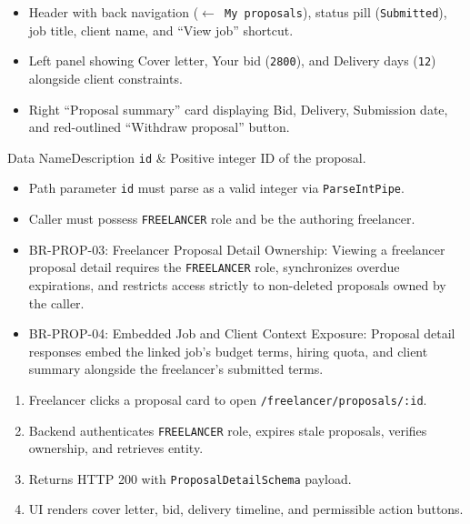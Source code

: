 \begin{itemize}[leftmargin=1.6em,topsep=3pt,itemsep=2pt,parsep=0pt,label=$\bullet$]
    \item Header with back navigation (\texttt{$\leftarrow$ My proposals}), status pill (\texttt{Submitted}), job title, client name, and ``View job'' shortcut.
    \item Left panel showing Cover letter, Your bid (\texttt{2800}), and Delivery days (\texttt{12}) alongside client constraints.
    \item Right ``Proposal summary'' card displaying Bid, Delivery, Submission date, and red-outlined ``Withdraw proposal'' button.
\end{itemize}


\begin{specdatatable}{Data Name}{Description}
\texttt{id} & Positive integer ID of the proposal.\\ \hline
\end{specdatatable}

\begin{itemize}[leftmargin=1.6em,topsep=3pt,itemsep=2pt,parsep=0pt,label=$\bullet$]
    \item Path parameter \texttt{id} must parse as a valid integer via \texttt{ParseIntPipe}.
    \item Caller must possess \texttt{FREELANCER} role and be the authoring freelancer.
\end{itemize}

\begin{itemize}[leftmargin=1.6em,topsep=3pt,itemsep=2pt,parsep=0pt,label=$\bullet$]\brrulelist
    \item BR-PROP-03: Freelancer Proposal Detail Ownership: Viewing a freelancer proposal detail requires the \texttt{FREELANCER} role, synchronizes overdue expirations, and restricts access strictly to non-deleted proposals owned by the caller.
    \item BR-PROP-04: Embedded Job and Client Context Exposure: Proposal detail responses embed the linked job's budget terms, hiring quota, and client summary alongside the freelancer's submitted terms.
\end{itemize}

\begin{enumerate}[leftmargin=1.8em,topsep=3pt,itemsep=2pt,parsep=0pt]
    \item Freelancer clicks a proposal card to open \texttt{/freelancer/proposals/:id}.
    \item Backend authenticates \texttt{FREELANCER} role, expires stale proposals, verifies ownership, and retrieves entity.
    \item Returns HTTP 200 with \texttt{ProposalDetailSchema} payload.
    \item UI renders cover letter, bid, delivery timeline, and permissible action buttons.
\end{enumerate}

